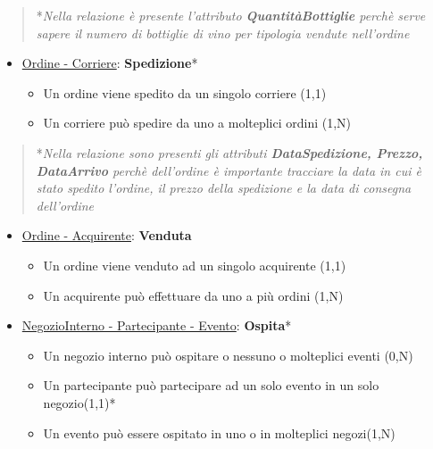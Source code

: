 \begin{verse}
	*\emph{Nella relazione è presente l'attributo \textbf{QuantitàBottiglie} perchè serve sapere il numero di bottiglie di vino per tipologia vendute nell'ordine}
\end{verse}

\begin{itemize}
	\item \underline{Ordine - Corriere}: \textbf{Spedizione}*
	
	\begin{itemize}
		\item Un ordine viene spedito da un singolo corriere (1,1)
		\item Un corriere può spedire da uno a molteplici ordini (1,N)
	\end{itemize}
	
\end{itemize}

\begin{verse}
	*\emph{Nella relazione sono presenti gli attributi \textbf{DataSpedizione, Prezzo, DataArrivo} perchè dell'ordine è importante tracciare la data in cui è stato spedito l'ordine, il prezzo della spedizione e la data di consegna dell'ordine}
\end{verse}

\begin{itemize}
	\item \underline{Ordine - Acquirente}: \textbf{Venduta}
	
	\begin{itemize}
		\item Un ordine viene venduto ad un singolo acquirente (1,1)
		\item Un acquirente può effettuare da uno a più ordini (1,N)
	\end{itemize}
	
\end{itemize}

\begin{itemize}
	\item \underline{NegozioInterno - Partecipante - Evento}: \textbf{Ospita}*
	
	\begin{itemize}
		\item Un negozio interno può ospitare o nessuno o molteplici eventi (0,N)
		\item Un partecipante può partecipare ad un solo evento in un solo negozio(1,1)*
		\item Un evento può essere ospitato in uno o in molteplici negozi(1,N)
	\end{itemize}
	
\end{itemize}

